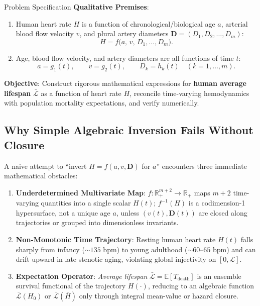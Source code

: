 \documentclass[11pt,a4paper]{article}
\newcommand{\Lbar}{\bar{\mathcal{L}}}
\begin{document}
\begin{setupbox}{Problem Specification}
\textbf{Qualitative Premises}:
\begin{enumerate}[leftmargin=1.5em,itemsep=2pt]
  \item Human heart rate $H$ is a function of chronological/biological age $a$, arterial blood flow velocity $v$, and plural artery diameters $\mathbf{D} = (D_1, D_2, \dots, D_m)$:
  \begin{equation}
    H = f\bigl(a,\, v,\, D_1, \dots, D_m\bigr).
  \end{equation}
  \item Age, blood flow velocity, and artery diameters are all functions of time $t$:
  \begin{equation}
    a = g_1(t), \qquad v = g_2(t), \qquad D_k = h_k(t) \quad (k = 1,\dots,m).
  \end{equation}
\end{enumerate}
\textbf{Objective}: Construct rigorous mathematical expressions for \textbf{human average lifespan} $\Lbar$ as a function of heart rate $H$, reconcile time-varying hemodynamics with population mortality expectations, and verify numerically.
\end{setupbox}

\subsection{Why Simple Algebraic Inversion Fails Without Closure}
A naive attempt to ``invert $H = f(a, v, \mathbf{D})$ for $a$'' encounters three immediate mathematical obstacles:
\begin{enumerate}[leftmargin=1.5em,itemsep=2pt]
  \item \textbf{Underdetermined Multivariate Map}: $f: \mathbb{R}_+^{m+2} \to \mathbb{R}_+$ maps $m+2$ time-varying quantities into a single scalar $H(t)$; $f^{-1}(H)$ is a codimension-1 hypersurface, not a unique age $a$, unless $(v(t), \mathbf{D}(t))$ are closed along trajectories or grouped into dimensionless invariants.
  \item \textbf{Non-Monotonic Time Trajectory}: Resting human heart rate $H(t)$ falls sharply from infancy ($\sim 135\text{ bpm}$) to young adulthood ($\sim 60\text{--}65\text{ bpm}$) and can drift upward in late stenotic aging, violating global injectivity on $[0, \mathcal{L}]$.
  \item \textbf{Expectation Operator}: \emph{Average lifespan} $\Lbar = \mathbb{E}[T_{\mathrm{death}}]$ is an ensemble survival functional of the trajectory $H(\cdot)$, reducing to an algebraic function $\Lbar(H_0)$ or $\Lbar(\bar{H})$ only through integral mean-value or hazard closure.
\end{enumerate}
\end{document}
